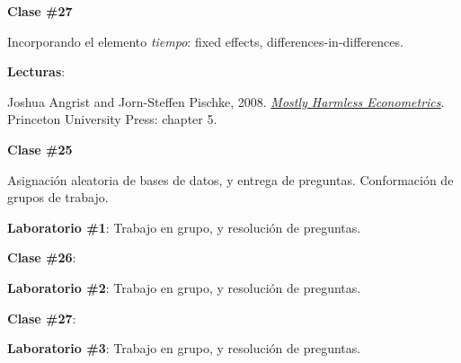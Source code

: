\documentclass[letterpaper]{article}
\renewenvironment{itemize}{
  \begin{list}{}{
    \setlength{\leftmargin}{1.5em}
  }
}{
  \end{list}
}
\begin{document}
\begin{enumerate}
      \begin{itemize} 
        \item[$\bullet$] {\bf Clase \#27}
          \begin{itemize} 
            \item[$\circ$] Incorporando el elemento \emph{tiempo}: fixed effects, differences-in-differences.
            \item[$\circ$] {\bf Lecturas}: 
              \begin{itemize}
                \item[$\diamond$] Joshua Angrist and Jorn-Steffen Pischke, 2008. \href{https://github.com/hbahamonde/Metodos_de_Investigacion/raw/master/Readings/MHE.pdf}{\emph{Mostly Harmless Econometrics}}. Princeton University Press: chapter 5.
              \end{itemize}
          \end{itemize}
      \end{itemize}


			\begin{itemize} 
				\item[$\bullet$] {\bf Clase \#25}
					\begin{itemize} 
						\item[$\circ$] Asignaci\'on aleatoria de bases de datos, y entrega de preguntas. Conformaci\'on de grupos de trabajo.
						\item[$\circ$] {\bf Laboratorio \#1}: Trabajo en grupo, y resoluci\'on de preguntas.
					\end{itemize}
			\end{itemize}


			\begin{itemize} 
				\item[$\bullet$] {\bf Clase \#26}:
					\begin{itemize} 
						\item[$\circ$] {\bf Laboratorio \#2}: Trabajo en grupo, y resoluci\'on de preguntas.
					\end{itemize}
			\end{itemize}


			\begin{itemize} 
				\item[$\bullet$] {\bf Clase \#27}:
					\begin{itemize} 
						\item[$\circ$] {\bf Laboratorio \#3}: Trabajo en grupo, y resoluci\'on de preguntas.
					\end{itemize}
			\end{itemize}




\end{enumerate}
\end{document}
